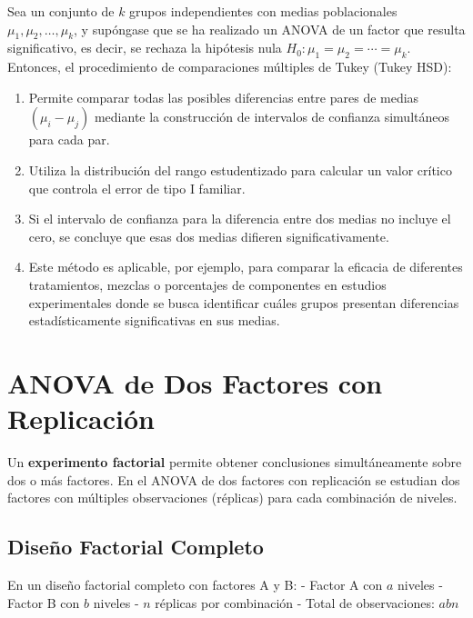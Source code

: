 \begin{theorem}
Sea un conjunto de $k$ grupos independientes con medias poblacionales $\mu_1, \mu_2, \ldots, \mu_k$, y supóngase que se ha realizado un ANOVA de un factor que resulta significativo, es decir, se rechaza la hipótesis nula $H_0: \mu_1 = \mu_2 = \cdots = \mu_k$. Entonces, el procedimiento de comparaciones múltiples de Tukey (Tukey HSD):

\begin{enumerate}
    \item Permite comparar todas las posibles diferencias entre pares de medias $(\mu_i - \mu_j)$ mediante la construcción de intervalos de confianza simultáneos para cada par.
    \item Utiliza la distribución del rango estudentizado para calcular un valor crítico que controla el error de tipo I familiar.
    \item Si el intervalo de confianza para la diferencia entre dos medias no incluye el cero, se concluye que esas dos medias difieren significativamente.
    \item Este método es aplicable, por ejemplo, para comparar la eficacia de diferentes tratamientos, mezclas o porcentajes de componentes en estudios experimentales donde se busca identificar cuáles grupos presentan diferencias estadísticamente significativas en sus medias.
\end{enumerate}
\end{theorem}


\section{ANOVA de Dos Factores con Replicación}

\begin{definition}
Un \textbf{experimento factorial} permite obtener conclusiones simultáneamente sobre dos o más factores. En el ANOVA de dos factores con replicación se estudian dos factores con múltiples observaciones (réplicas) para cada combinación de niveles.
\end{definition}

\subsection{Diseño Factorial Completo}

En un diseño factorial completo con factores A y B:
- Factor A con $a$ niveles
- Factor B con $b$ niveles  
- $n$ réplicas por combinación
- Total de observaciones: $abn$

